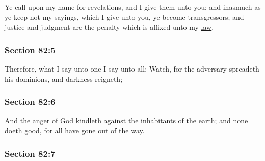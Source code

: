 		Ye call upon my name for revelations, and I give them unto you; and inasmuch as ye keep not my sayings, which I give unto you, ye become transgressors; and justice and judgment are the penalty which is affixed unto my \hyperref[LAW]{law}.


	\subsubsection{Section 82:5} %
		\label{DC82-5}

		Therefore, what I say unto one I say unto all: Watch, for the adversary spreadeth his dominions, and darkness reigneth;


	\subsubsection{Section 82:6} %
		\label{DC82-6}

		And the anger of God kindleth against the inhabitants of the earth; and none doeth good, for all have gone out of the way.


	\subsubsection{Section 82:7} %
		\label{DC82-7}

